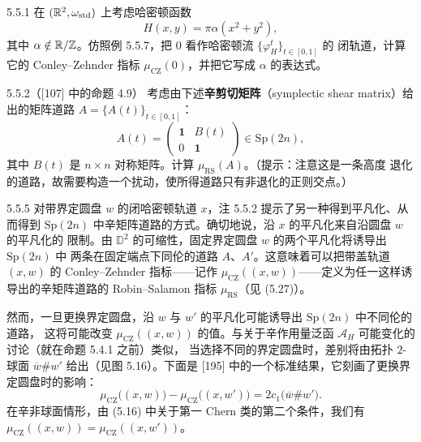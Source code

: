 \begin{wexer}{5.5.1}
  在 $(\mathbb{R}^2,\omega_{\mathrm{std}})$ 上考虑哈密顿函数
  \[
    H(x,y)=\pi\alpha(x^2+y^2),
  \]
  其中 $\alpha\notin\mathbb{R}/\mathbb{Z}$。仿照例 5.5.7，把 $0$ 看作哈密顿流 $\{\varphi_H^t\}_{t\in[0,1]}$ 的
  闭轨道，计算它的 Conley--Zehnder 指标 $\mu_{\mathrm{CZ}}(0)$，并把它写成 $\alpha$ 的表达式。
\end{wexer}

\begin{wexer}{5.5.2}（[107] 中的命题 4.9）
  考虑由下述\textbf{辛剪切矩阵}（symplectic shear matrix）给出的矩阵道路
  $A=\{A(t)\}_{t\in[0,1]}$：
  \[
    A(t)=\begin{pmatrix}\mathbf{1}&B(t)\\ 0&\mathbf{1}\end{pmatrix}\in\mathrm{Sp}(2n),
  \]
  其中 $B(t)$ 是 $n\times n$ 对称矩阵。计算 $\mu_{\mathrm{RS}}(A)$。（提示：注意这是一条高度
  退化的道路，故需要构造一个扰动，使所得道路只有非退化的正则交点。）
\end{wexer}

\begin{wrem}{5.5.5}
  对带界定圆盘 $w$ 的闭哈密顿轨道 $x$，注 5.5.2 提示了另一种得到平凡化、从而得到
  $\mathrm{Sp}(2n)$ 中辛矩阵道路的方式。确切地说，沿 $x$ 的平凡化来自沿圆盘 $w$ 的平凡化的
  限制。由 $\mathbb{D}^2$ 的可缩性，固定界定圆盘 $w$ 的两个平凡化将诱导出 $\mathrm{Sp}(2n)$ 中
  两条在固定端点下同伦的道路 $A$、$A'$。这意味着可以把带盖轨道 $(x,w)$ 的 Conley--Zehnder
  指标——记作 $\mu_{\mathrm{CZ}}((x,w))$——定义为任一这样诱导出的辛矩阵道路的
  Robin--Salamon 指标 $\mu_{\mathrm{RS}}$（见 (5.27)）。
\end{wrem}

然而，一旦更换界定圆盘，沿 $w$ 与 $w'$ 的平凡化可能诱导出 $\mathrm{Sp}(2n)$ 中不同伦的道路，
这将可能改变 $\mu_{\mathrm{CZ}}((x,w))$ 的值。与关于辛作用量泛函 $\mathcal{A}_H$ 可能变化的
讨论（就在命题 5.4.1 之前）类似，
当选择不同的界定圆盘时，差别将由拓扑 $2$-球面 $\overline{w}\#w'$ 给出（见图 5.16）。下面是
[195] 中的一个标准结果，它刻画了更换界定圆盘时的影响：
\[
  \mu_{\mathrm{CZ}}\bigl((x,w)\bigr)-\mu_{\mathrm{CZ}}\bigl((x,w')\bigr)
    =2c_1\bigl(\overline{w}\#w'\bigr).
\]
在辛非球面情形，由 (5.16) 中关于第一 Chern 类的第二个条件，我们有
$\mu_{\mathrm{CZ}}((x,w))=\mu_{\mathrm{CZ}}((x,w'))$。
